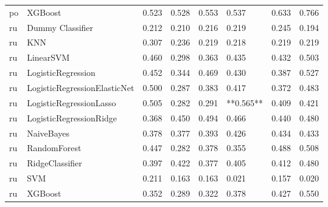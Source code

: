 \begin{tabular}{llllllll}
      po &                      XGBoost & 0.523 &                     0.528 &                 0.553 &                  0.537 &                                   0.633 &     0.766 \\
      ru &             Dummy Classifier & 0.212 &                     0.210 &                 0.216 &                  0.219 &                                   0.245 &     0.194 \\
      ru &                          KNN & 0.307 &                     0.236 &                 0.219 &                  0.218 &                                   0.219 &     0.219 \\
      ru &                    LinearSVM & 0.460 &                     0.298 &                 0.363 &                  0.435 &                                   0.432 &     0.503 \\
      ru &           LogisticRegression & 0.452 &                     0.344 &                 0.469 &                  0.430 &                                   0.387 &     0.527 \\
      ru & LogisticRegressionElasticNet & 0.500 &                     0.287 &                 0.383 &                  0.417 &                                   0.372 &     0.483 \\
      ru &      LogisticRegressionLasso & 0.505 &                     0.282 &                 0.291 &              **0.565** &                                   0.409 &     0.421 \\
      ru &      LogisticRegressionRidge & 0.368 &                     0.450 &                 0.494 &                  0.466 &                                   0.440 &     0.480 \\
      ru &                   NaiveBayes & 0.378 &                     0.377 &                 0.393 &                  0.426 &                                   0.434 &     0.433 \\
      ru &                 RandomForest & 0.447 &                     0.282 &                 0.378 &                  0.355 &                                   0.488 &     0.508 \\
      ru &              RidgeClassifier & 0.397 &                     0.422 &                 0.377 &                  0.405 &                                   0.412 &     0.480 \\
      ru &                          SVM & 0.211 &                     0.163 &                 0.163 &                  0.021 &                                   0.157 &     0.020 \\
      ru &                      XGBoost & 0.352 &                     0.289 &                 0.322 &                  0.378 &                                   0.427 &     0.550 \\
\bottomrule
\end{tabular}
